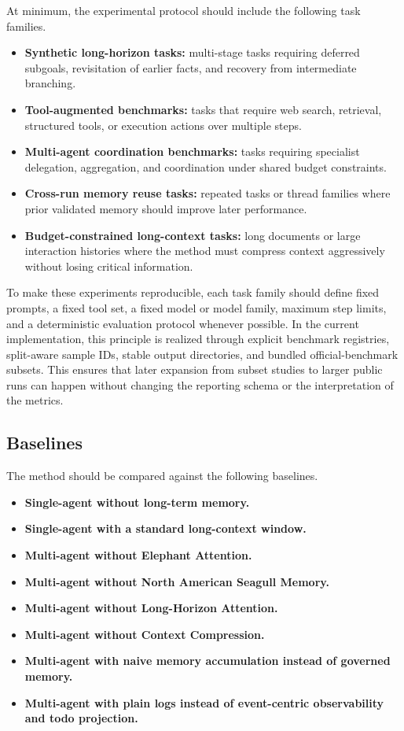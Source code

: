 \documentclass[a4paper,fleqn]{cas-sc}
\begin{document}
At minimum, the experimental protocol should include the following task families.
\begin{itemize}
\item \textbf{Synthetic long-horizon tasks:} multi-stage tasks requiring deferred subgoals, revisitation of earlier facts, and recovery from intermediate branching.
\item \textbf{Tool-augmented benchmarks:} tasks that require web search, retrieval, structured tools, or execution actions over multiple steps.
\item \textbf{Multi-agent coordination benchmarks:} tasks requiring specialist delegation, aggregation, and coordination under shared budget constraints.
\item \textbf{Cross-run memory reuse tasks:} repeated tasks or thread families where prior validated memory should improve later performance.
\item \textbf{Budget-constrained long-context tasks:} long documents or large interaction histories where the method must compress context aggressively without losing critical information.
\end{itemize}

To make these experiments reproducible, each task family should define fixed prompts, a fixed tool set, a fixed model or model family, maximum step limits, and a deterministic evaluation protocol whenever possible. In the current implementation, this principle is realized through explicit benchmark registries, split-aware sample IDs, stable output directories, and bundled official-benchmark subsets. This ensures that later expansion from subset studies to larger public runs can happen without changing the reporting schema or the interpretation of the metrics.
\subsection{Baselines}

The method should be compared against the following baselines.
\begin{itemize}
\item \textbf{Single-agent without long-term memory.}
\item \textbf{Single-agent with a standard long-context window.}
\item \textbf{Multi-agent without Elephant Attention.}
\item \textbf{Multi-agent without North American Seagull Memory.}
\item \textbf{Multi-agent without Long-Horizon Attention.}
\item \textbf{Multi-agent without Context Compression.}
\item \textbf{Multi-agent with naive memory accumulation instead of governed memory.}
\item \textbf{Multi-agent with plain logs instead of event-centric observability and todo projection.}
\end{itemize}
\end{document}
